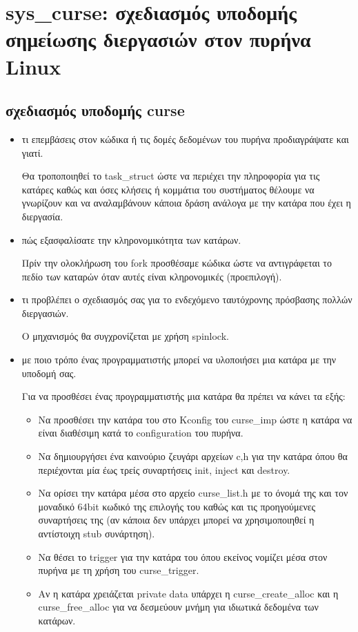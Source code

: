 \documentclass[a4paper,11pt]{article} \usepackage{anysize}
\begin{document}
\renewcommand{\theenumi}{\roman{enumi}}


\section*{sys\_curse: σχεδιασμός υποδομής σημείωσης διεργασιών στον πυρήνα Linux}
\subsection*{σχεδιασμός υποδομής curse}
\begin{itemize}
    \item τι επεμβάσεις στον κώδικα ή τις δομές δεδομένων του πυρήνα προδιαγράψατε και γιατί.

        Θα τροποποιηθεί το task\_struct ώστε να περιέχει την πληροφορία για
        τις κατάρες καθώς και όσες κλήσεις ή κομμάτια του συστήματος θέλουμε
        να γνωρίζουν και να αναλαμβάνουν κάποια δράση ανάλογα με την κατάρα
        που έχει η διεργασία.

    \item πώς εξασφαλίσατε την κληρονομικότητα των κατάρων.

        Πρίν την ολοκλήρωση του fork προσθέσαμε κώδικα ώστε να αντιγράφεται το
        πεδίο των καταρών όταν αυτές είναι κληρονομικές (προεπιλογή).


    \item τι προβλέπει ο σχεδιασμός σας για το ενδεχόμενο ταυτόχρονης πρόσβασης πολλών διεργασιών.

        Ο μηχανισμός θα συγχρονίζεται με χρήση spinlock.

    \item με ποιο τρόπο ένας προγραμματιστής μπορεί να υλοποιήσει μια κατάρα με την υποδομή σας.

        Για να προσθέσει ένας προγραμματιστής μια κατάρα θα πρέπει να κάνει τα
        εξής:
        \begin{itemize}
            \item Να προσθέσει την κατάρα του στο Kconfig του curse\_imp ώστε 
                η κατάρα να είναι διαθέσιμη κατά το configuration του πυρήνα.
            \item Να δημιουργήσει ένα καινούριο ζευγάρι αρχείων c,h για την
                κατάρα όπου θα περιέχονται μία έως τρείς συναρτήσεις
                init, inject και destroy. 
            \item Να ορίσει την κατάρα μέσα στο αρχείο curse\_list.h με το
                όνομά της και τον μοναδικό 64bit κωδικό της επιλογής του καθώς
                και τις προηγούμενες συναρτήσεις της (αν κάποια δεν υπάρχει
                μπορεί να χρησιμοποιηθεί η αντίστοιχη stub συνάρτηση).
            \item Να θέσει το trigger για την κατάρα του όπου εκείνος νομίζει
                μέσα στον πυρήνα με τη χρήση του curse\_trigger.
            \item Αν η κατάρα χρειάζεται private data υπάρχει η
                curse\_create\_alloc και η curse\_free\_alloc για να δεσμεύουν
                μνήμη για ιδιωτικά δεδομένα των κατάρων.
        \end{itemize}



\end{itemize}
\end{document}
